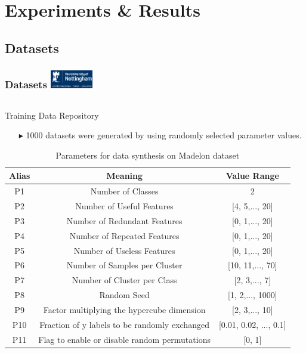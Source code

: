 \documentclass[aspectratio=1610]{beamer}
\newcommand{\UoN}
  {\hfill {\includegraphics[height=0.8cm]{nott_logo/nott_logo_white.png}}}
\begin{document}
  
\section{Experiments \& Results}
\subsection{Datasets}
\begin{frame}
\frametitle{Datasets \UoN}

\begin{columns}[T]
	\begin{column}{0.5\textwidth}
		\begin{block}{Training Data Repository}
			\begin{itemize}
				\item[$\blacktriangleright$] 1000 datasets were generated by using randomly selected parameter values.
			\end{itemize}
		\end{block}
	
		\begin{table}\tiny
		\caption{\scriptsize{Parameters for data synthesis on Madelon dataset}}
		\centering
		\begin{tabular}{c|c|c}
			\hline
			\textbf{Alias}  & \textbf{Meaning}   & \textbf{Value Range}  \\ \hline
			P1  & Number of Classes  &   2  \\ \hline
			P2  & Number of Useful Features	& [4, 5,..., 20] \\ \hline
			P3  & Number of Redundant Features & [0, 1,..., 20] \\ \hline
			P4  & Number of Repeated Features	& [0, 1,..., 20] \\ \hline
			P5  & Number of Useless Features      & [0, 1,..., 20] \\ \hline
			P6  & Number of Samples per Cluster & [10, 11,..., 70] \\ \hline
			P7  & Number of Cluster per Class  & [2, 3,..., 7] \\ \hline
			P8  & Random Seed       & [1, 2,..., 1000]   \\ \hline
			P9  & Factor multiplying the hypercube dimension  & [2, 3,..., 10]  \\ \hline
			P10 & Fraction of y labels to be randomly exchanged & [0.01, 0.02, ..., 0.1] \\ \hline
			P11 & Flag to enable or disable random permutations & [0, 1] \\ \hline
		\end{tabular}
	\end{table}	
	\end{column}


\end{columns}
\end{frame}
\end{document}
